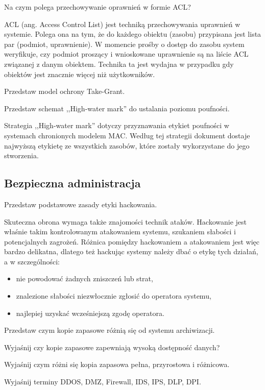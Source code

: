 \documentclass[answers,11pt]{exam}
\begin{document}
\begin{questions}
\question Na czym polega przechowywanie oprawnień w formie ACL?
\begin{solution}
ACL (ang. Access Control List) jest techniką przechowywania uprawnień w systemie. Polega ona na tym, że do każdego obiektu (zasobu) przypisana jest lista par (podmiot, uprawnienie). W momencie prośby o dostęp do zasobu system weryfikuje, czy podmiot proszący i wnioskowane uprawnienie są na liście ACL związanej z danym obiektem. Technika ta jest wydajna w przypadku gdy obiektów jest znacznie więcej niż użytkowników.
\end{solution}

\question Przedstaw model ochrony Take-Grant.

\question Przedstaw schemat ,,High-water mark'' do ustalania poziomu poufności.
\begin{solution}
Strategia ,,High-water mark'' dotyczy przyznawania etykiet poufności w systemach chronionych modelem MAC. Według tej strategii dokument dostaje najwyższą etykietę ze wszystkich zasobów, które zostały wykorzystane do jego stworzenia.
\end{solution}



\end{questions}

\subsection{Bezpieczna administracja}
\begin{questions}

\question Przedstaw podstawowe zasady etyki hackowania.
\begin{solution}
Skuteczna obrona wymaga także znajomości technik ataków. Hackowanie jest właśnie takim kontrolowanym atakowaniem systemu, szukaniem słabości i potencjalnych zagrożeń. Różnica pomiędzy hackowaniem a atakowaniem jest więc bardzo delikatna, dlatego też hackując systemy należy dbać o etykę tych działań, a w szczególności:
\begin{itemize}
\item nie powodować żadnych zniszczeń lub strat,
\item znalezione słabości niezwłocznie zgłosić do operatora systemu,
\item najlepiej uzyskać wcześniejszą zgodę operatora.
\end{itemize}
\end{solution}

\question Przedstaw czym kopie zapasowe różnią się od systemu archiwizacji.

\question Wyjaśnij czy kopie zapasowe zapewniają wysoką dostępność danych?

\question Wyjaśnij czym różni się kopia zapasowa pełna, przyrostowa i różnicowa.

\question Wyjaśnij terminy DDOS, DMZ, Firewall, IDS, IPS, DLP, DPI.

\end{questions}
\end{document}
